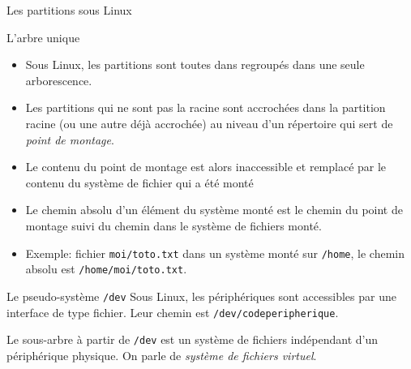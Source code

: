\begin{frame}{Les partitions sous Linux}
  \begin{block}{L'arbre unique}
    \begin{itemize}
    \item Sous Linux, les partitions sont toutes dans regroupés dans une seule arborescence.
    \item[\ddialogsystem] Les partitions qui ne sont pas la racine sont accrochées dans
      la partition racine (ou une autre déjà accrochée) au niveau d'un
      répertoire qui sert de \emph{point de montage}.
    \item[\ddialogerror] Le contenu du point de montage est alors
      inaccessible et remplacé par le contenu du système de fichier qui
      a été monté
    \item Le chemin absolu d'un élément du système monté est le chemin
      du point de montage suivi du chemin dans le système de fichiers
      monté.
    \item[\ddialoginformation] Exemple: fichier \texttt{moi/toto.txt}
      dans un système monté sur \texttt{/home}, le chemin absolu est
      \texttt{/home/moi/toto.txt}.
    \end{itemize}
  \end{block}
  \begin{block}{Le pseudo-système \texttt{/dev}}
    Sous Linux, les périphériques sont accessibles par une interface de
    type fichier. Leur chemin est \texttt{/dev/codeperipherique}. 

    Le sous-arbre à partir de \texttt{/dev} est un système de fichiers
    indépendant d'un périphérique physique. On parle de \emph{système de
      fichiers virtuel}.
  \end{block}
\end{frame}


